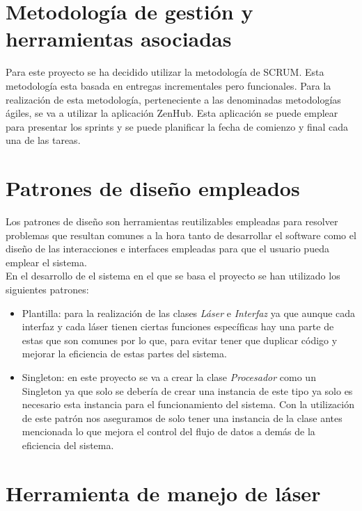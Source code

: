 \section{Metodología de gestión y herramientas asociadas}

Para este proyecto se ha decidido utilizar la metodología de SCRUM. Esta metodología esta basada en entregas incrementales pero funcionales. Para la realización de esta metodología, perteneciente a las denominadas metodologías ágiles, se va a utilizar la aplicación ZenHub. Esta aplicación se puede emplear para presentar los sprints y se puede planificar la fecha de comienzo y final cada una de las tareas.

\section{Patrones de diseño empleados}

Los patrones de diseño son herramientas reutilizables empleadas para resolver problemas que resultan comunes a la hora tanto de desarrollar el software como el diseño de las interacciones e interfaces empleadas para que el usuario pueda emplear el sistema.\\
En el desarrollo de el sistema en el que se basa el proyecto se han utilizado los siguientes patrones:
\begin{itemize}
    \item Plantilla: para la realización de las clases \textit{Láser} e \textit{Interfaz} ya que aunque cada interfaz y cada láser tienen ciertas funciones específicas hay una parte de estas que son comunes por lo que, para evitar tener que duplicar código y mejorar la eficiencia de estas partes del sistema.
    \item Singleton: en este proyecto se va a crear la clase \textit{Procesador} como un Singleton ya que solo se debería de crear una instancia de este tipo ya solo es necesario esta instancia para el funcionamiento del  sistema. Con la utilización de este patrón nos aseguramos de solo tener una instancia de la clase antes mencionada lo que mejora el control del flujo de datos a demás de la eficiencia del sistema.\\
\end{itemize}

\section{Herramienta de manejo de láser}

